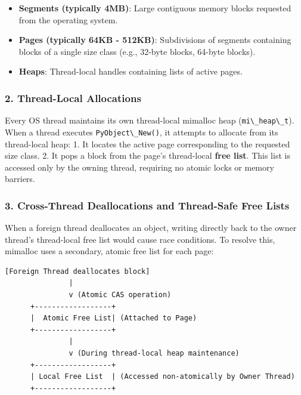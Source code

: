 \begin{itemize}
\tightlist
\item
  \textbf{Segments (typically 4MB)}: Large contiguous memory blocks
  requested from the operating system.
\item
  \textbf{Pages (typically 64KB - 512KB)}: Subdivisions of segments
  containing blocks of a single size class (e.g., 32-byte blocks,
  64-byte blocks).
\item
  \textbf{Heaps}: Thread-local handles containing lists of active pages.
\end{itemize}

\hypertarget{thread-local-allocations}{%
\subsubsection{2. Thread-Local
Allocations}\label{thread-local-allocations}}

Every OS thread maintains its own thread-local mimalloc heap
(\passthrough{\lstinline!mi\_heap\_t!}). When a thread executes
\passthrough{\lstinline!PyObject\_New()!}, it attempts to allocate from
its thread-local heap: 1. It locates the active page corresponding to
the requested size class. 2. It pops a block from the page's
thread-local \textbf{free list}. This list is accessed only by the
owning thread, requiring no atomic locks or memory barriers.

\hypertarget{cross-thread-deallocations-and-thread-safe-free-lists}{%
\subsubsection{3. Cross-Thread Deallocations and Thread-Safe Free
Lists}\label{cross-thread-deallocations-and-thread-safe-free-lists}}

When a foreign thread deallocates an object, writing directly back to
the owner thread's thread-local free list would cause race conditions.
To resolve this, mimalloc uses a secondary, atomic free list for each
page:

\begin{lstlisting}
[Foreign Thread deallocates block]
               |
               v (Atomic CAS operation)
      +------------------+
      |  Atomic Free List| (Attached to Page)
      +------------------+
               |
               v (During thread-local heap maintenance)
      +------------------+
      | Local Free List  | (Accessed non-atomically by Owner Thread)
      +------------------+
\end{lstlisting}

